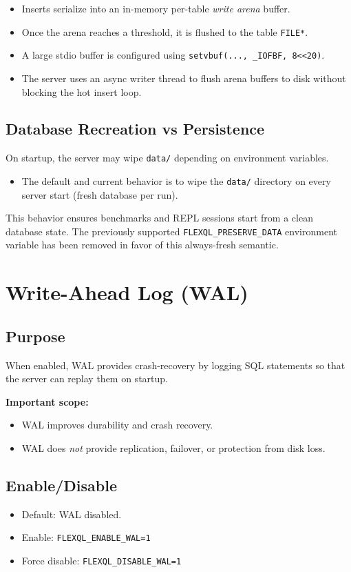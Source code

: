 \documentclass[11pt]{article}
\begin{document}
\begin{itemize}[leftmargin=*]
\item Inserts serialize into an in-memory per-table \emph{write arena} buffer.
\item Once the arena reaches a threshold, it is flushed to the table \texttt{FILE*}.
\item A large stdio buffer is configured using \texttt{setvbuf(..., \_IOFBF, 8<<20)}.
\item The server uses an async writer thread to flush arena buffers to disk without blocking the hot insert loop.
\end{itemize}

\subsection{Database Recreation vs Persistence}
On startup, the server may wipe \texttt{data/} depending on environment variables.

\begin{itemize}[leftmargin=*]
\item The default and current behavior is to wipe the \texttt{data/} directory on every server start (fresh database per run).
\end{itemize}

This behavior ensures benchmarks and REPL sessions start from a clean database state. The previously supported \texttt{FLEXQL\_PRESERVE\_DATA} environment variable has been removed in favor of this always-fresh semantic.

\section{Write-Ahead Log (WAL)}
\subsection{Purpose}
When enabled, WAL provides crash-recovery by logging SQL statements so that the server can replay them on startup.

\textbf{Important scope:}
\begin{itemize}[leftmargin=*]
\item WAL improves durability and crash recovery.
\item WAL does \emph{not} provide replication, failover, or protection from disk loss.
\end{itemize}

\subsection{Enable/Disable}
\begin{itemize}[leftmargin=*]
\item Default: WAL disabled.
\item Enable: \texttt{FLEXQL\_ENABLE\_WAL=1}
\item Force disable: \texttt{FLEXQL\_DISABLE\_WAL=1}
\end{itemize}
\end{document}
